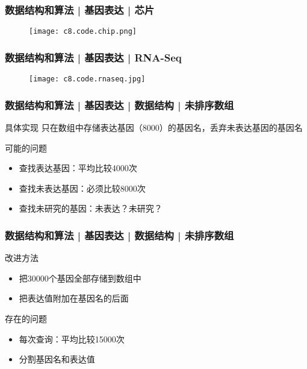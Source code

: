 \begin{frame}
  \frametitle{数据结构和算法 | 基因表达 | 芯片}
  \begin{figure}
    \centering
    \texttt{[image: c8.code.chip.png]}
  \end{figure}
\end{frame}

\begin{frame}
  \frametitle{数据结构和算法 | 基因表达 | RNA-Seq}
  \begin{figure}
    \centering
    \texttt{[image: c8.code.rnaseq.jpg]}
  \end{figure}
\end{frame}

\begin{frame}
  \frametitle{数据结构和算法 | 基因表达 | 数据结构 | 未排序数组}
  \begin{block}{具体实现}
    只在数组中存储表达基因（8000）的基因名，丢弃未表达基因的基因名
  \end{block}
  \pause
  \begin{block}{可能的问题}
    \begin{itemize}
      \item 查找表达基因：平均比较4000次
      \item 查找未表达基因：必须比较8000次
      \item 查找未研究的基因：未表达？未研究？
    \end{itemize}
  \end{block}
\end{frame}

\begin{frame}
  \frametitle{数据结构和算法 | 基因表达 | 数据结构 | 未排序数组}
  \begin{block}{改进方法}
    \begin{itemize}
      \item 把30000个基因全部存储到数组中
      \item 把表达值附加在基因名的后面
    \end{itemize}
  \end{block}
  \pause
  \begin{block}{存在的问题}
    \begin{itemize}
      \item 每次查询：平均比较15000次
      \item 分割基因名和表达值
    \end{itemize}
  \end{block}
\end{frame}


